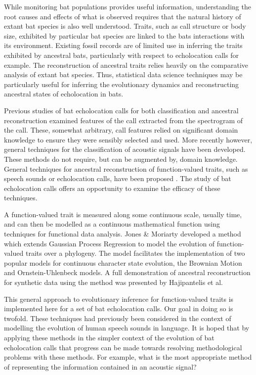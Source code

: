 \documentclass[wsdraft]{ws-rv9x6} %
\begin{document}
While monitoring bat populations provides useful information, understanding the root causes and effects of what is observed requires that the natural history of extant bat species is also well understood. Traits, such as call structure or body size, exhibited by particular bat species are linked to the bats interactions with its environment. \cite{aldridge1987morphology} Existing fossil records are of limited use in inferring the traits exhibited by ancestral bats, particularly with respect to echolocation calls for example. The reconstruction of ancestral traits relies heavily on the comparative analysis\cite{felsenstein2004inferring} of extant bat species. Thus, statistical data science techniques may be particularly useful for inferring the evolutionary dynamics and reconstructing ancestral states of echolocation in bats.

Previous studies of bat echolocation calls for both classification \cite{walters2012continental} and ancestral reconstruction \cite{collen2012evolution} examined features of the call extracted from the spectrogram of the call. These, somewhat arbitrary, call features relied on significant domain knowledge to ensure they were sensibly selected and used. More recently however, general techniques for the classification of acoustic signals have been developed. \cite{stathopoulos2014bat} \cite{damoulas2010bayesian} These methods do not require, but can be augmented by, domain knowledge. General techniques for ancestral reconstruction of function-valued traits, such as speech sounds or echolocation calls, have been proposed \cite{group2012phylogenetic}. The study of bat echolocation calls offers an opportunity to examine the efficacy of these techniques.

A function-valued trait is measured along some continuous scale, usually time, and can then be modelled as a continuous mathematical function using techniques for functional data analysis. \cite{ramsay2006functional} Jones \& Moriarty \cite{jones2013evolutionary} developed a method which extends Gaussian Process Regression \cite{rasmussen2006gaussian} to model the evolution of function-valued traits over a phylogeny. The model facilitates the implementation of two popular models for continuous character state evolution,\cite{joy2016ancestral} the Brownian Motion and Ornstein-Uhlenbeck models.\cite{lande1976natural} A full demonstration of ancestral reconstruction for synthetic data using the method was presented by Hajipantelis et al.\cite{hadjipantelis2013function}

This general approach to evolutionary inference for function-valued traits is implemented here for a set of bat echolocation calls. Our goal in doing so is twofold. These techniques had previously been considered in the context of modelling the evolution of human speech sounds in language. \cite{group2012phylogenetic} It is hoped that by applying these methods in the simpler context of the evolution of bat echolocation calls that progress can be made towards resolving methodological problems with these methods. For example, what is the most appropriate method of representing the information contained in an acoustic signal?  
\end{document}

